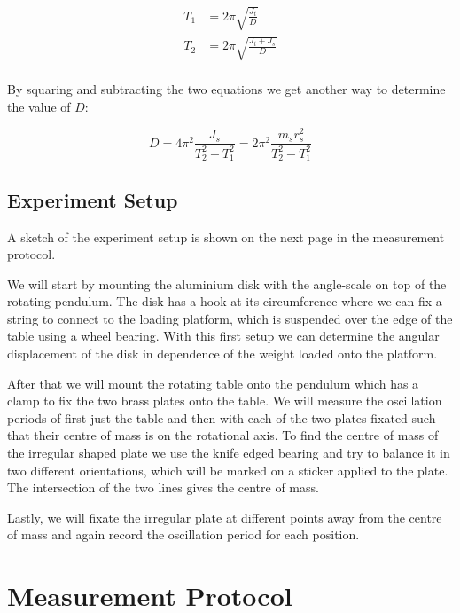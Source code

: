 \documentclass{article}
\begin{document}
\begin{equation}
    \begin{split}
        T_1 &= 2\pi\sqrt{\frac{J_t}{D}} \\
        T_2 &= 2\pi\sqrt{\frac{J_t + J_s}{D}} \\
    \end{split}
\end{equation}

By squaring and subtracting the two equations we get another way to determine the value of $D$:

\begin{equation}
    D=4\pi^2 \frac{J_s}{T_2^2 - T_1^2} = 2\pi^2 \frac{m_sr_s^2}{T_2^2 - T_1^2}
\end{equation}

\newpage

\subsection{Experiment Setup}

A sketch of the experiment setup is shown on the next page in the measurement protocol. 

We will start by mounting the aluminium disk with the angle-scale on top of the rotating pendulum. The disk has a hook at its circumference where we can fix a string to connect to the loading platform, which is suspended over the edge of the table using a wheel bearing. With this first setup we can determine the angular displacement of the disk in dependence of the weight loaded onto the platform.

After that we will mount the rotating table onto the pendulum which has a clamp to fix the two brass plates onto the table. We will measure the oscillation periods of first just the table and then with each of the two plates fixated such that their centre of mass is on the rotational axis. To find the centre of mass of the irregular shaped plate we use the knife edged bearing and try to balance it in two different orientations, which will be marked on a sticker applied to the plate. The intersection of the two lines gives the centre of mass.  

Lastly, we will fixate the irregular plate at different points away from the centre of mass and again record the oscillation period for each position.

\newpage

\section{Measurement Protocol}
\end{document}
